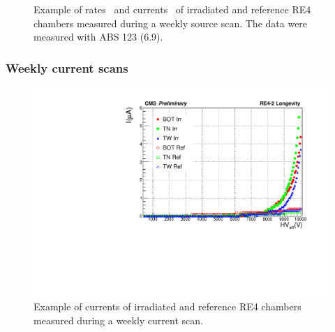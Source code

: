 \begin{figure}[H]
\begin{subfigure}{0.5\linewidth}
        	\caption{\label{fig:weekly-source:B}}
    	\end{subfigure}
		\caption{\label{fig:weekly-source} Example of rates~ and currents~ of irradiated and reference RE4 chambers measured during a weekly source scan. The data were measured with ABS 123 (6.9).}
	\end{figure}
	
		\subsubsection{Weekly current scans}
		\label{chapt5:sssec:currentscan}
	
\begingroup\setlength{\intextsep}{0pt}\setlength{\columnsep}{15pt}
	
	\begin{figure}
		\centering
    	\includegraphics[width = \linewidth]{fig/chapt5/Weekly-current-Scan.pdf}
		\caption{\label{fig:weekly-current} Example of currents of irradiated and reference RE4 chambers measured during a weekly current scan.}
	\end{figure}
		
